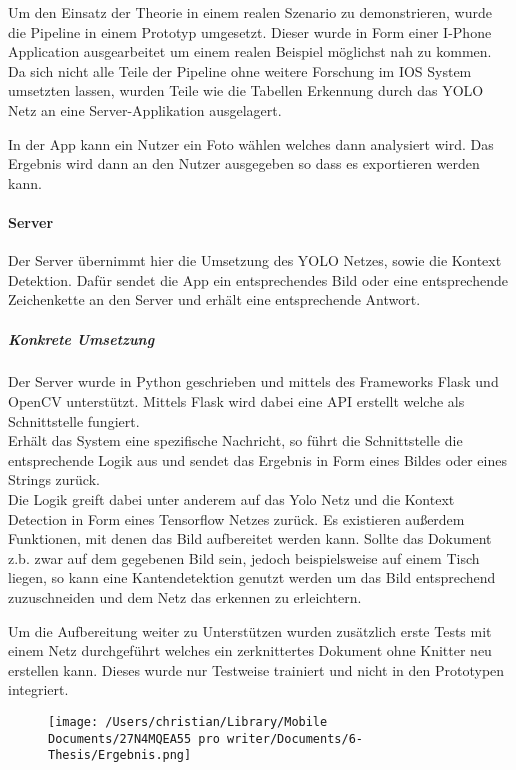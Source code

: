 \documentclass[
]{article}
\begin{document}
Um den Einsatz der Theorie in einem realen Szenario zu demonstrieren,
wurde die Pipeline in einem Prototyp umgesetzt. Dieser wurde in Form
einer I-Phone Application ausgearbeitet um einem realen Beispiel
möglichst nah zu kommen.\\
Da sich nicht alle Teile der Pipeline ohne weitere Forschung im IOS
System umsetzten lassen, wurden Teile wie die Tabellen Erkennung durch
das YOLO Netz an eine Server-Applikation ausgelagert.

In der App kann ein Nutzer ein Foto wählen welches dann analysiert wird.
Das Ergebnis wird dann an den Nutzer ausgegeben so dass es exportieren
werden kann.

\hypertarget{header-n208}{%
\paragraph{Server}\label{header-n208}}

Der Server übernimmt hier die Umsetzung des YOLO Netzes, sowie die
Kontext Detektion. Dafür sendet die App ein entsprechendes Bild oder
eine entsprechende Zeichenkette an den Server und erhält eine
entsprechende Antwort.

\hypertarget{header-n210}{%
\subparagraph{Konkrete Umsetzung}\label{header-n210}}

Der Server wurde in Python geschrieben und mittels des Frameworks Flask
und OpenCV unterstützt. Mittels Flask wird dabei eine API erstellt
welche als Schnittstelle fungiert. \\
Erhält das System eine spezifische Nachricht, so führt die Schnittstelle
die entsprechende Logik aus und sendet das Ergebnis in Form eines Bildes
oder eines Strings zurück. \\
Die Logik greift dabei unter anderem auf das Yolo Netz und die Kontext
Detection in Form eines Tensorflow Netzes zurück. Es existieren außerdem
Funktionen, mit denen das Bild aufbereitet werden kann. Sollte das
Dokument z.b. zwar auf dem gegebenen Bild sein, jedoch beispielsweise
auf einem Tisch liegen, so kann eine Kantendetektion genutzt werden um
das Bild entsprechend zuzuschneiden und dem Netz das erkennen zu
erleichtern.

Um die Aufbereitung weiter zu Unterstützen wurden zusätzlich erste Tests
mit einem Netz durchgeführt welches ein zerknittertes Dokument ohne
Knitter neu erstellen kann. Dieses wurde nur Testweise trainiert und
nicht in den Prototypen integriert.

\begin{figure}
\centering
\texttt{[image: /Users/christian/Library/Mobile Documents/27N4MQEA55~pro~writer/Documents/6-Thesis/Ergebnis.png]}
\caption{}
\end{figure}
\end{document}
